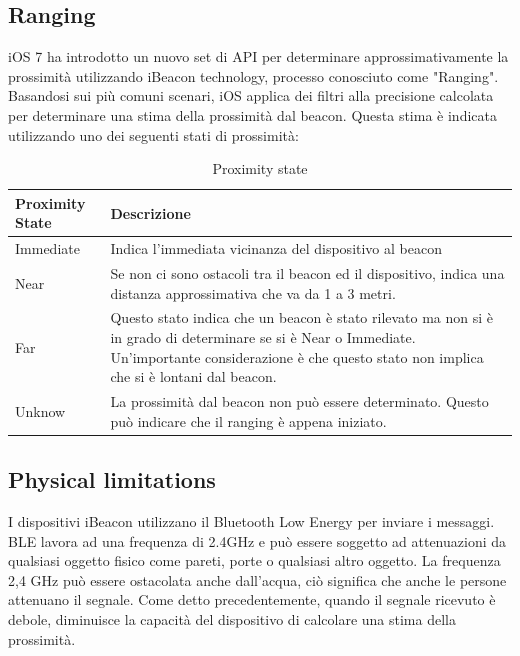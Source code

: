 \subsection{Ranging}
iOS 7 ha introdotto un nuovo set di API per determinare approssimativamente la prossimità utilizzando iBeacon technology, processo conosciuto come "Ranging". 
Basandosi sui più comuni scenari, iOS applica dei filtri alla precisione calcolata per determinare una stima della prossimità dal beacon.
Questa stima è indicata utilizzando uno dei seguenti stati di prossimità:
\begin{table}[htbp]
\begin{center}
\begin{tabular}{|l|p{9cm}|}
\hline
Proximity State & Descrizione \\
\hline
Immediate & Indica l'immediata vicinanza del dispositivo al beacon \\
\hline
Near & Se non ci sono ostacoli tra il beacon ed il dispositivo, indica una distanza approssimativa che va da 1 a 3 metri. \\
\hline
Far & Questo stato indica che un beacon è stato rilevato ma non si è in grado di determinare se si è Near o Immediate. 
Un'importante considerazione è che questo stato non implica che si è lontani dal beacon.\\
\hline
Unknow & La prossimità dal beacon non può essere determinato.
Questo può indicare che il ranging è appena iniziato. \\
\hline
\end{tabular}
\end{center}
\caption{Proximity state}
\label{tab:table}
\end{table}

\subsection{Physical limitations}
I dispositivi iBeacon utilizzano il Bluetooth Low Energy per inviare i messaggi.
BLE lavora ad una frequenza di 2.4GHz e può essere soggetto ad attenuazioni da qualsiasi oggetto fisico come pareti, porte o qualsiasi altro oggetto. La frequenza 2,4 GHz può essere ostacolata anche dall'acqua, ciò significa che anche le persone attenuano il segnale. Come detto precedentemente, quando il segnale ricevuto è debole, diminuisce la capacità del dispositivo di calcolare una stima della prossimità.
